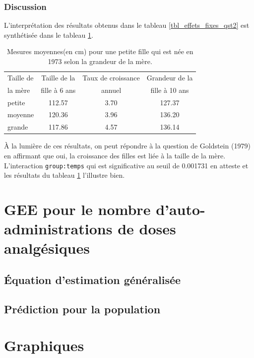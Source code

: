 \documentclass{article}
\begin{document}
	\subsubsection*{Discussion}
		L'interprétation des résultats obtenus dans le tableau \ref{tbl_effets_fixes_qst2} est synthétisée dans le tableau \ref{tbl_interpretation_qst2}.
		\begin{table}[H]
			\centering
			\begin{tabular}{lccc}
				\hline
				Taille de  & Taille de la  & Taux de croissance  &  Grandeur de la \\
				la mère & fille à 6 ans & annuel &  fille à 10 ans \\
				\hline
				petite & 112.57 & 3.70 & 127.37 \\
				moyenne & 120.36 & 3.96 & 136.20 \\
				grande & 117.86 & 4.57 & 136.14 \\
				\hline
			\end{tabular}
			\caption{Mesures moyennes(en cm) pour une petite fille qui est née en 1973 selon la grandeur de la mère.}
			\label{tbl_interpretation_qst2}
		\end{table}
				
		À la lumière de ces résultats, on peut répondre à la question de Goldstein (1979) en affirmant que oui, la croissance des filles est liée à la taille de la mère.
		L'interaction \texttt{group:temps} qui est significative au seuil de 0.001731 en atteste et les résultats du tableau \ref{tbl_interpretation_qst2} l'illustre bien.
		

\section{GEE pour le nombre d'auto-administrations de doses analgésiques}
	
	
	\subsection{Équation d'estimation généralisée}
	
	\subsection{Prédiction pour la population}
	
	
\newpage
\appendix
\section{Graphiques}
\renewcommand\thesubsection{\thesection.\arabic{subsection}}
\end{document}
